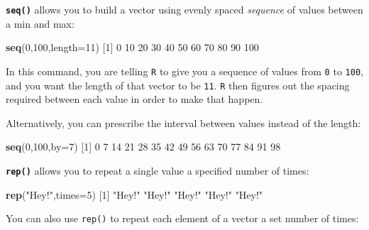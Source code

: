 \documentclass[]{book}
\newenvironment{Shaded}{\begin{snugshade}}{\end{snugshade}}
\newcommand{\DataTypeTok}[1]{\textcolor[rgb]{0.13,0.29,0.53}{#1}}
\newcommand{\DecValTok}[1]{\textcolor[rgb]{0.00,0.00,0.81}{#1}}
\newcommand{\KeywordTok}[1]{\textcolor[rgb]{0.13,0.29,0.53}{\textbf{#1}}}
\newcommand{\NormalTok}[1]{#1}
\newcommand{\StringTok}[1]{\textcolor[rgb]{0.31,0.60,0.02}{#1}}
\begin{document}
\textbf{\texttt{seq()}} allows you to build a vector using evenly spaced \emph{sequence} of values between a min and max:

\begin{Shaded}
\begin{Highlighting}[]
\KeywordTok{seq}\NormalTok{(}\DecValTok{0}\NormalTok{,}\DecValTok{100}\NormalTok{,}\DataTypeTok{length=}\DecValTok{11}\NormalTok{)}
\NormalTok{ [}\DecValTok{1}\NormalTok{]   }\DecValTok{0}  \DecValTok{10}  \DecValTok{20}  \DecValTok{30}  \DecValTok{40}  \DecValTok{50}  \DecValTok{60}  \DecValTok{70}  \DecValTok{80}  \DecValTok{90} \DecValTok{100}
\end{Highlighting}
\end{Shaded}

In this command, you are telling \texttt{R} to give you a sequence of values from \texttt{0} to \texttt{100}, and you want the length of that vector to be \texttt{11}. \texttt{R} then figures out the spacing required between each value in order to make that happen.

Alternatively, you can prescribe the interval between values instead of the length:

\begin{Shaded}
\begin{Highlighting}[]
\KeywordTok{seq}\NormalTok{(}\DecValTok{0}\NormalTok{,}\DecValTok{100}\NormalTok{,}\DataTypeTok{by=}\DecValTok{7}\NormalTok{)}
\NormalTok{ [}\DecValTok{1}\NormalTok{]  }\DecValTok{0}  \DecValTok{7} \DecValTok{14} \DecValTok{21} \DecValTok{28} \DecValTok{35} \DecValTok{42} \DecValTok{49} \DecValTok{56} \DecValTok{63} \DecValTok{70} \DecValTok{77} \DecValTok{84} \DecValTok{91} \DecValTok{98}
\end{Highlighting}
\end{Shaded}

\textbf{\texttt{rep()}} allows you to repeat a single value a specified number of times:

\begin{Shaded}
\begin{Highlighting}[]
\KeywordTok{rep}\NormalTok{(}\StringTok{"Hey!"}\NormalTok{,}\DataTypeTok{times=}\DecValTok{5}\NormalTok{)}
\NormalTok{[}\DecValTok{1}\NormalTok{] }\StringTok{"Hey!"} \StringTok{"Hey!"} \StringTok{"Hey!"} \StringTok{"Hey!"} \StringTok{"Hey!"}
\end{Highlighting}
\end{Shaded}

You can also use \texttt{rep()} to repeat each element of a vector a set number of times:
\end{document}
